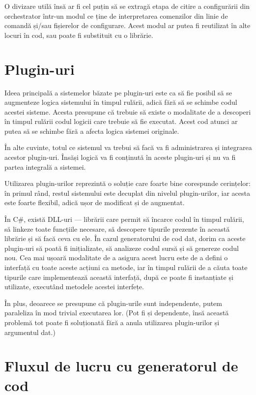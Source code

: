 \documentclass[a4paper,12pt]{report}
\begin{document}
O divizare utilă însă ar fi cel puțin să se extragă etapa de citire a configurării din orchestrator într-un modul ce ține de interpretarea comenzilor din linie de comandă și/sau fișierelor de configurare.
Acest modul ar putea fi reutilizat în alte locuri în cod, sau poate fi substituit cu o librărie.

\section{Plugin-uri}

Ideea principală a sistemelor băzate pe plugin-uri este ca să fie posibil să se augmenteze logica sistemului în timpul rulării, adică fără să se schimbe codul acestei sisteme.
Acesta presupune că trebuie să existe o modalitate de a descoperi în timpul rulării codul logicii care trebuie să fie executat.
Acest cod atunci ar putea să se schimbe fără a afecta logica sistemei originale.

În alte cuvinte, totul ce sistemul va trebui să facă va fi administrarea și integrarea acestor plugin-uri.
Însăși logică va fi conținută în aceste plugin-uri și nu va fi partea integrală a sistemei.

Utilizarea plugin-urilor reprezintă o soluție care foarte bine corespunde cerințelor: în primul rând, restul sistemului este decuplat din nivelul plugin-urilor, iar acesta este foarte flexibil, adică ușor de modificat și de augmentat.

În C\#, există DLL-uri --- librării care permit să încarce codul în timpul rulării, să linkeze toate funcțiile necesare, să descopere tipurile prezente în această librărie și să facă ceva cu ele.
În cazul generatorului de cod dat, dorim ca aceste plugin-uri să poată fi inițializate, să analizeze codul sursă și să genereze codul nou.
Cea mai ușoară modalitate de a asigura acest lucru este de a defini o interfață cu toate aceste acțiuni ca metode, iar în timpul rulării de a căuta toate tipurile care implementează această interfață, după ce poate fi instanțiate și utilizate, executând metodele acestei interfețe. 

În plus, deoarece se presupune că plugin-urile sunt independente, putem paraleliza în mod trivial executarea lor.
(Pot fi și dependente, însă această problemă tot poate fi soluționată fără a anula utilizarea plugin-urilor și argumentul dat.)

\section{Fluxul de lucru cu generatorul de cod}
\end{document}

